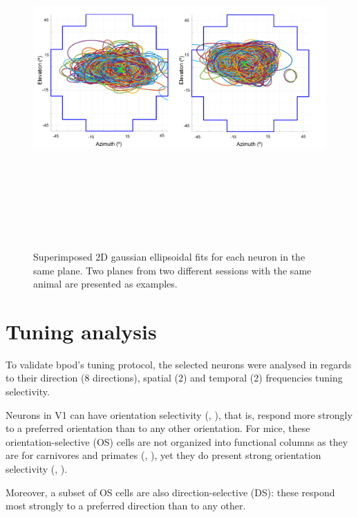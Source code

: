\begin{figure}[H] \centering \includegraphics[width=13cm,height=13cm,keepaspectratio]{Figures/7.Results/rf/ellipsesAnimal4pos2andpos5.png} 
\caption{Superimposed 2D gaussian ellipsoidal fits for each neuron in the same plane. Two planes from two different sessions with the same animal are presented as examples.}
\label{ellipses}
\end{figure}

\section{Tuning analysis}
\label{tuningresults}

To validate bpod's tuning protocol, the selected neurons were analysed in regards to their direction (8 directions), spatial (2) and temporal (2) frequencies tuning selectivity.

Neurons in V1 can have orientation selectivity (\cite{Hubel1959}, \cite{Hubel1962}), that is, respond more strongly to a preferred orientation than to any other orientation. For mice, these orientation-selective (OS) cells are not organized into functional columns as they are for carnivores and primates (\cite{Hubel1962}, \cite{Hubel1968}), yet they do present strong orientation selectivity (\cite{Girman1999}, \cite{Ohki2005}). 

Moreover, a subset of  OS cells are also direction-selective (DS): these respond most strongly to a preferred direction than to any other.

